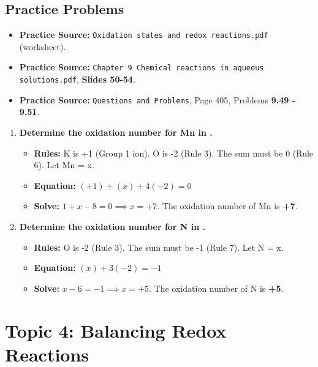 \documentclass{article}
\begin{document}
\subsection*{Practice Problems}
\begin{itemize}[itemsep=5pt]
    \item \textbf{Practice Source:} \texttt{Oxidation states and redox reactions.pdf} (worksheet).
    \item \textbf{Practice Source:} \texttt{Chapter 9 Chemical reactions in aqueous solutions.pdf}, \textbf{Slides 50-54}.
    \item \textbf{Practice Source:} \texttt{Questions and Problems}, Page 405, Problems \textbf{9.49 - 9.51}.
\end{itemize}
\begin{enumerate}[itemsep=5pt]
    \item \textbf{Determine the oxidation number for Mn in .}
    \begin{itemize}
        \item \textbf{Rules:} K is +1 (Group 1 ion). O is -2 (Rule 3). The sum must be 0 (Rule 6). Let Mn = x.
        \item \textbf{Equation:} \( (+1) + (x) + 4(-2) = 0 \)
        \item \textbf{Solve:} \( 1 + x - 8 = 0 \implies x = +7 \). The oxidation number of Mn is \textbf{+7}.
    \end{itemize}
    \item \textbf{Determine the oxidation number for N in .}
    \begin{itemize}
        \item \textbf{Rules:} O is -2 (Rule 3). The sum must be -1 (Rule 7). Let N = x.
        \item \textbf{Equation:} \( (x) + 3(-2) = -1 \)
        \item \textbf{Solve:} \( x - 6 = -1 \implies x = +5 \). The oxidation number of N is \textbf{+5}.
    \end{itemize}
\end{enumerate}

\newpage

\section*{Topic 4: Balancing Redox Reactions}
\end{document}
